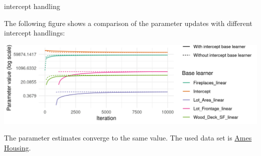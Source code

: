 \documentclass[11pt,compress,t,notes=noshow, xcolor=table]{beamer}
\begin{document}
\begin{vbframe}{intercept handling}

\framebreak

The following figure shows a comparison of the parameter updates with different intercept handlings:
\begin{center}
\includegraphics[width = \textwidth]{figure/compboost-intercept-handling.png}
\end{center}
The parameter estimates converge to the same value. The used data set is \href{https://github.com/topepo/AmesHousing}{Ames Housing}.


\end{vbframe}
\end{document}
